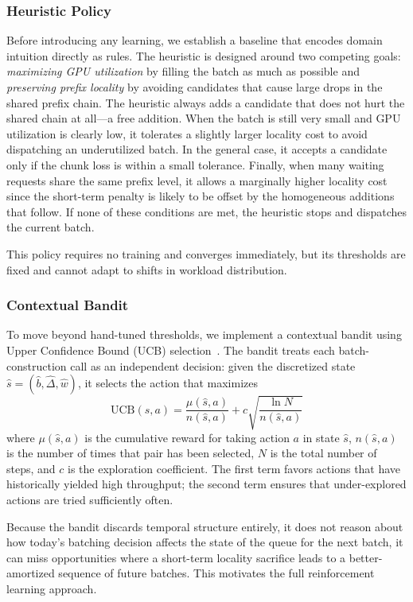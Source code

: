\subsubsection*{Heuristic Policy}
Before introducing any learning, we establish a baseline that encodes domain intuition directly as rules. The heuristic is designed around two competing goals: \emph{maximizing GPU utilization} by filling the batch as much as possible and \emph{preserving prefix locality} by avoiding candidates that cause large drops in the shared prefix chain. The heuristic always adds a candidate that does not hurt the shared chain at all—a free addition. When the batch is still very small and GPU utilization is clearly low, it tolerates a slightly larger locality cost to avoid dispatching an underutilized batch. In the general case, it accepts a candidate only if the chunk loss is within a small tolerance. Finally, when many waiting requests share the same prefix level, it allows a marginally higher locality cost since the short-term penalty is likely to be offset by the homogeneous additions that follow. If none of these conditions are met, the heuristic stops and dispatches the current batch.

This policy requires no training and converges immediately, but its thresholds are fixed and cannot adapt to shifts in workload distribution.

\subsubsection*{Contextual Bandit}
To move beyond hand-tuned thresholds, we implement a contextual bandit using Upper Confidence Bound (UCB) selection~\cite{auer2002finite}. The bandit treats each batch-construction call as an independent decision: given the discretized state $\hat{s} = (\hat{b}, \hat{\Delta}, \hat{w})$, it selects the action that maximizes
\[
  \mathrm{UCB}(\hat{s},a) = \frac{\mu(\hat{s},a)}{n(\hat{s},a)} + c\sqrt{\frac{\ln N}{n(\hat{s},a)}}
\]
where $\mu(\hat{s}, a)$ is the cumulative reward for taking action $a$ in state $\hat{s}$, $n(\hat{s}, a)$ is the number of times that pair has been selected, $N$ is the total number of steps, and $c$ is the exploration coefficient. The first term favors actions that have historically yielded high throughput; the second term ensures that under-explored actions are tried sufficiently often.

Because the bandit discards temporal structure entirely, it does not reason about how today's batching decision affects the state of the queue for the next batch, it can miss opportunities where a short-term locality sacrifice leads to a better-amortized sequence of future batches. This motivates the full reinforcement learning approach.

